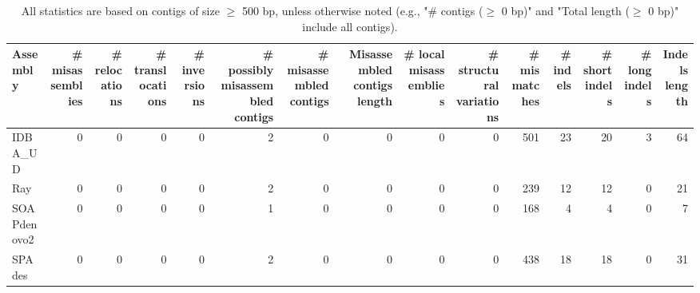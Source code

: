 \documentclass[12pt,a4paper]{article}
\begin{document}
\begin{table}[ht]
\begin{center}
\caption{All statistics are based on contigs of size $\geq$ 500 bp, unless otherwise noted (e.g., "\# contigs ($\geq$ 0 bp)" and "Total length ($\geq$ 0 bp)" include all contigs).}
\begin{tabular}{|l*{14}{|r}|}
\hline
Assembly & \# misassemblies &     \# relocations &     \# translocations &     \# inversions & \# possibly misassembled contigs & \# misassembled contigs & Misassembled contigs length & \# local misassemblies & \# structural variations & \# mismatches & \# indels &     \# short indels &     \# long indels & Indels length \\ \hline
IDBA\_UD & 0 & 0 & 0 & 0 & 2 & 0 & 0 & 0 & 0 & 501 & 23 & 20 & 3 & 64 \\ \hline
Ray & 0 & 0 & 0 & 0 & 2 & 0 & 0 & 0 & 0 & 239 & 12 & 12 & 0 & 21 \\ \hline
SOAPdenovo2 & 0 & 0 & 0 & 0 & 1 & 0 & 0 & 0 & 0 & 168 & 4 & 4 & 0 & 7 \\ \hline
SPAdes & 0 & 0 & 0 & 0 & 2 & 0 & 0 & 0 & 0 & 438 & 18 & 18 & 0 & 31 \\ \hline
\end{tabular}
\end{center}
\end{table}
\end{document}

